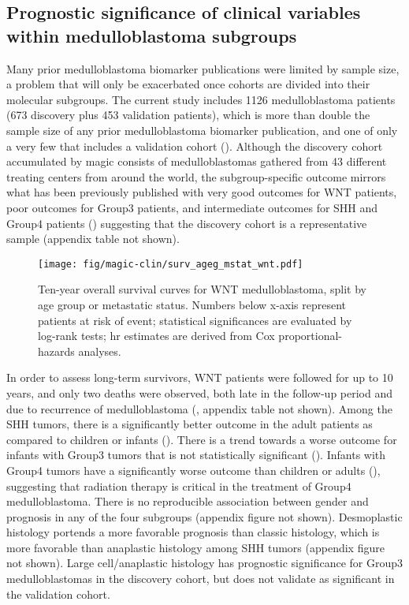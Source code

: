 \subsection{Prognostic significance of clinical variables within medulloblastoma subgroups}

Many prior medulloblastoma biomarker publications were limited by sample size, a problem that will only be exacerbated once cohorts are divided into their molecular subgroups. The current study includes 1126 medulloblastoma patients (673 discovery plus 453 validation patients), which is more than double the sample size of any prior medulloblastoma biomarker publication, and one of only a very few that includes a validation cohort (). Although the discovery cohort accumulated by \gls{magic} consists of medulloblastomas gathered from 43 different treating centers from around the world, the subgroup-specific outcome mirrors what has been previously published with very good outcomes for WNT patients, poor outcomes for Group3 patients, and intermediate outcomes for SHH and Group4 patients () suggesting that the discovery cohort is a representative sample (appendix table not shown).

\begin{figure}[h]
	\begin{center}
		\texttt{[image: fig/magic-clin/surv\_ageg\_mstat\_wnt.pdf]}
	\end{center}
	\caption[Ten-year overall survival curves for WNT medulloblastoma]
	{
	Ten-year overall survival curves for WNT medulloblastoma, split by age group or metastatic status.
	Numbers below x-axis represent patients at risk of event; statistical significances are evaluated by log-rank tests; \gls{hr} estimates are derived from Cox proportional-hazards analyses.
	}
	\label{fig:surv_ageg_mstat_wnt}
\end{figure}

In order to assess long-term survivors, WNT patients were followed for up to 10 years, and only two deaths were observed, both late in the follow-up period and due to recurrence of medulloblastoma (, appendix table not shown).  Among the SHH tumors, there is a significantly better outcome in the adult patients as compared to children or infants ().  There is a trend towards a worse outcome for infants with Group3 tumors that is not statistically significant ().  Infants with Group4 tumors have a significantly worse outcome than children or adults (), suggesting that radiation therapy is critical in the treatment of Group4 medulloblastoma. There is no reproducible association between gender and prognosis in any of the four subgroups (appendix figure not shown). Desmoplastic histology portends a more favorable prognosis than classic histology, which is more favorable than anaplastic histology among SHH tumors (appendix figure not shown). Large cell/anaplastic histology has prognostic significance for Group3 medulloblastomas in the discovery cohort, but does not validate as significant in the validation cohort.

